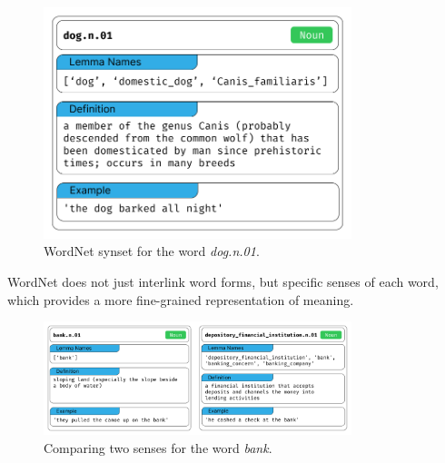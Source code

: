 \begin{figure}
    \centering
    \includegraphics[width=0.8\textwidth]{figures/wordnet_single_synset.png}
    \caption{WordNet synset for the word \textit{dog.n.01}.}
    \label{fig:wordnet_single_synset}
\end{figure}

WordNet does not just interlink word forms, but specific senses of each word, which provides a more fine-grained representation of meaning.

\begin{figure}
    \centering
    \includegraphics[width=0.8\textwidth]{figures/wordnet_multiple_synset.png}
    \caption{Comparing two senses for the word \textit{bank}.}
    \label{fig:wordnet_multiple_synset}
\end{figure}



